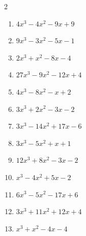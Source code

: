 \begin{multicols}{2}
\begin{enumerate}
  \item $4x^{3}-4x^{2}-9x+9$

        \phantom{$=(2x+3)(2x-3)(x-1)$}

\columnbreak %

  \item $9x^{3}-3x^{2}-5x-1$


  \item $2x^{3}+x^{2}-8x-4$

        \phantom{$=(2x+1)(x+2)(x-2)$}

  \item $27x^{3}-9x^{2}-12x+4$

        \phantom{$=(3x+2)(3x-1)(3x-2)$}

  \item $4x^{3}-8x^{2}-x+2$

        \phantom{$=(2x+1)(2x-1)(x-2)$}

  \item $3x^{3}+2x^{2}-3x-2$

        \phantom{$=(3x+2)(x+1)(x-1)$}

\columnbreak %

\resetques

  \item $3x^{3}-14x^{2}+17x-6$

        \phantom{$=(3x-2)(x-1)(x-3)$}

  \item $3x^{3}-5x^{2}+x+1$


  \item $12x^{3}+8x^{2}-3x-2$

        \phantom{$=(2x+1)(2x-1)(3x+2)$}

  \item $x^{3}-4x^{2}+5x-2$


  \item $6x^{3}-5x^{2}-17x+6$

        \phantom{$=(2x+3)(3x-1)(x-2)$}

\columnbreak %

  \item $3x^{3}+11x^{2}+12x+4$

        \phantom{$=(3x+2)(x+1)(x+2)$}

  \item $x^{3}+x^{2}-4x-4$


\end{enumerate}
\end{multicols}
